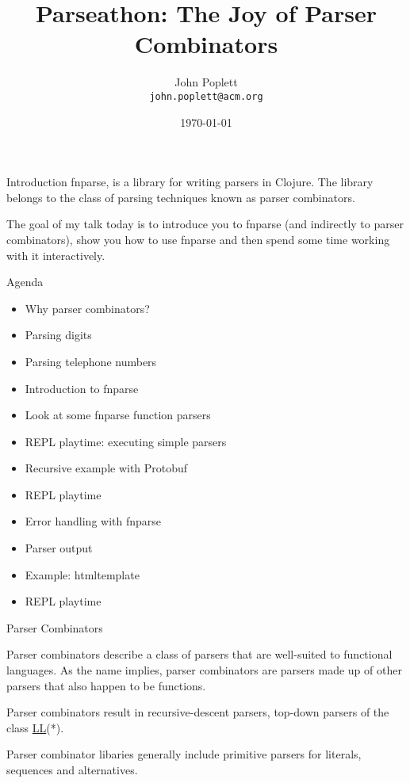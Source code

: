 \documentclass[presentation]{beamer}
\begin{document}
\title{Parseathon: The Joy of Parser Combinators}
\author{John Poplett\\
  \texttt{john.poplett@acm.org}}
\date{\today}

\begin{frame}[plain]
\titlepage
\end{frame}

\begin{frame}{Introduction}
fnparse, is a library for writing parsers in Clojure. The library
belongs to the class of parsing techniques known as parser combinators.

The goal of my talk today is to introduce you to fnparse (and
indirectly to parser combinators), show you how to use fnparse and
then spend some time working with it interactively.
\end{frame}

\begin{frame}{Agenda}

\begin{itemize}
\item Why parser combinators?
\item Parsing digits
\item Parsing telephone numbers
\item Introduction to fnparse
\item Look at some fnparse function parsers
\item REPL playtime: executing simple parsers
\item Recursive example with Protobuf
\item REPL playtime
\item Error handling with fnparse
\item Parser output
\item Example: htmltemplate
\item REPL playtime
\end{itemize}

\end{frame}

\begin{frame}{Parser Combinators}

  Parser combinators describe a class of parsers that are well-suited
  to functional languages. As the name implies, parser combinators are
  parsers made up of other parsers that also happen to be functions.

  Parser combinators result in recursive-descent parsers, top-down
  parsers of the class \href{http://en.wikipedia.org/wiki/LL_parser}{LL}(*).

  Parser combinator libaries generally include primitive parsers for
  literals, sequences and alternatives.

\end{frame}
\end{document}
